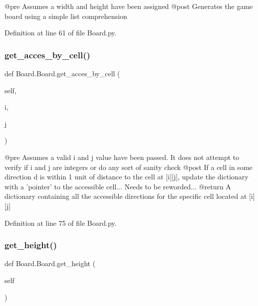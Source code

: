 \begin{DoxyVerb}@pre    Assumes a width and height have been assigned
    @post   Generates the game board using a simple list comprehension
\end{DoxyVerb}
 

Definition at line 61 of file Board.\+py.

\mbox{\label{class_board_1_1_board_a8c672c7842189de03079a86c757244d7}} 
\subsubsection{\texorpdfstring{get\+\_\+acces\+\_\+by\+\_\+cell()}{get\_acces\_by\_cell()}}
{\footnotesize\ttfamily def Board.\+Board.\+get\+\_\+acces\+\_\+by\+\_\+cell (\begin{DoxyParamCaption}\item[{}]{self,  }\item[{}]{i,  }\item[{}]{j }\end{DoxyParamCaption})}

\begin{DoxyVerb}@pre    Assumes a valid i and j value have been passed. It does not
attempt to verify if i and j are integers or do any sort of sanity
check
    @post   If a cell in some direction d is within 1 unit of distance
to the cell at [i][j], update the dictionary with a 'pointer' to the
accessible cell... Needs to be reworded...
    @return A dictionary containing all the accessible directions for
the specific cell located at [i][j]
\end{DoxyVerb}
 

Definition at line 75 of file Board.\+py.

\mbox{\label{class_board_1_1_board_a6134b116a4421868d9b70a90cae3cf6a}} 
\subsubsection{\texorpdfstring{get\+\_\+height()}{get\_height()}}
{\footnotesize\ttfamily def Board.\+Board.\+get\+\_\+height (\begin{DoxyParamCaption}\item[{}]{self }\end{DoxyParamCaption})}

